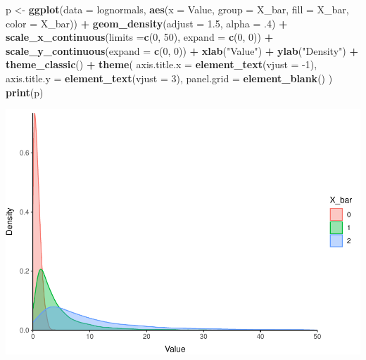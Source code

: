 \documentclass[
]{book}
\newenvironment{Shaded}{\begin{snugshade}}{\end{snugshade}}
\newcommand{\DataTypeTok}[1]{\textcolor[rgb]{0.13,0.29,0.53}{#1}}
\newcommand{\DecValTok}[1]{\textcolor[rgb]{0.00,0.00,0.81}{#1}}
\newcommand{\FloatTok}[1]{\textcolor[rgb]{0.00,0.00,0.81}{#1}}
\newcommand{\KeywordTok}[1]{\textcolor[rgb]{0.13,0.29,0.53}{\textbf{#1}}}
\newcommand{\NormalTok}[1]{#1}
\newcommand{\OperatorTok}[1]{\textcolor[rgb]{0.81,0.36,0.00}{\textbf{#1}}}
\newcommand{\StringTok}[1]{\textcolor[rgb]{0.31,0.60,0.02}{#1}}
\begin{document}
\begin{Shaded}
\begin{Highlighting}[]
\NormalTok{p <-}\StringTok{ }\KeywordTok{ggplot}\NormalTok{(}\DataTypeTok{data =}\NormalTok{ lognormals,}
            \KeywordTok{aes}\NormalTok{(}\DataTypeTok{x =}\NormalTok{ Value, }\DataTypeTok{group =}\NormalTok{ X_bar, }\DataTypeTok{fill =}\NormalTok{ X_bar, }\DataTypeTok{color =}\NormalTok{ X_bar)) }\OperatorTok{+}
\StringTok{  }\KeywordTok{geom_density}\NormalTok{(}\DataTypeTok{adjust =} \FloatTok{1.5}\NormalTok{, }\DataTypeTok{alpha =} \FloatTok{.4}\NormalTok{) }\OperatorTok{+}
\StringTok{  }\KeywordTok{scale_x_continuous}\NormalTok{(}\DataTypeTok{limits =}\KeywordTok{c}\NormalTok{(}\DecValTok{0}\NormalTok{, }\DecValTok{50}\NormalTok{), }\DataTypeTok{expand =} \KeywordTok{c}\NormalTok{(}\DecValTok{0}\NormalTok{, }\DecValTok{0}\NormalTok{)) }\OperatorTok{+}\StringTok{ }
\StringTok{  }\KeywordTok{scale_y_continuous}\NormalTok{(}\DataTypeTok{expand =} \KeywordTok{c}\NormalTok{(}\DecValTok{0}\NormalTok{, }\DecValTok{0}\NormalTok{)) }\OperatorTok{+}\StringTok{ }
\StringTok{  }\KeywordTok{xlab}\NormalTok{(}\StringTok{"Value"}\NormalTok{) }\OperatorTok{+}
\StringTok{  }\KeywordTok{ylab}\NormalTok{(}\StringTok{"Density"}\NormalTok{) }\OperatorTok{+}
\StringTok{  }\KeywordTok{theme_classic}\NormalTok{() }\OperatorTok{+}
\StringTok{  }\KeywordTok{theme}\NormalTok{(}
    \DataTypeTok{axis.title.x =} \KeywordTok{element_text}\NormalTok{(}\DataTypeTok{vjust =} \DecValTok{-1}\NormalTok{),}
    \DataTypeTok{axis.title.y =} \KeywordTok{element_text}\NormalTok{(}\DataTypeTok{vjust =} \DecValTok{3}\NormalTok{),}
    \DataTypeTok{panel.grid =} \KeywordTok{element_blank}\NormalTok{()}
\NormalTok{  )}
\KeywordTok{print}\NormalTok{(p)}
\end{Highlighting}
\end{Shaded}

\includegraphics{worstr_files/figure-latex/unnamed-chunk-123-1.pdf}
\end{document}
